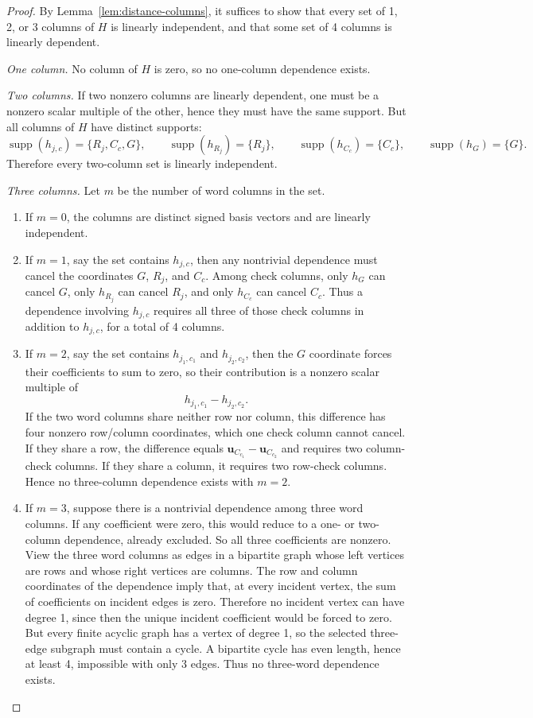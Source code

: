 \documentclass[11pt]{article}
\begin{document}
\begin{proof}
By Lemma~\ref{lem:distance-columns}, it suffices to show that every set of 1, 2, or 3 columns of $H$ is linearly independent, and that some set of 4 columns is linearly dependent.

\textit{One column.} No column of $H$ is zero, so no one-column dependence exists.

\textit{Two columns.} If two nonzero columns are linearly dependent, one must be a nonzero scalar multiple of the other, hence they must have the same support. But all columns of $H$ have distinct supports:
\[
    \operatorname{supp}(h_{j,c}) = \{R_j, C_c, G\},\qquad
    \operatorname{supp}(h_{R_j}) = \{R_j\},\qquad
    \operatorname{supp}(h_{C_c}) = \{C_c\},\qquad
    \operatorname{supp}(h_G) = \{G\}.
\]
Therefore every two-column set is linearly independent.

\textit{Three columns.} Let $m$ be the number of word columns in the set.
\begin{enumerate}[noitemsep]
    \item If $m = 0$, the columns are distinct signed basis vectors and are linearly independent.
    \item If $m = 1$, say the set contains $h_{j,c}$, then any nontrivial dependence must cancel the coordinates $G$, $R_j$, and $C_c$. Among check columns, only $h_G$ can cancel $G$, only $h_{R_j}$ can cancel $R_j$, and only $h_{C_c}$ can cancel $C_c$. Thus a dependence involving $h_{j,c}$ requires all three of those check columns in addition to $h_{j,c}$, for a total of 4 columns.
    \item If $m = 2$, say the set contains $h_{j_1,c_1}$ and $h_{j_2,c_2}$, then the $G$ coordinate forces their coefficients to sum to zero, so their contribution is a nonzero scalar multiple of
    \[
        h_{j_1,c_1} - h_{j_2,c_2}.
    \]
    If the two word columns share neither row nor column, this difference has four nonzero row/column coordinates, which one check column cannot cancel. If they share a row, the difference equals $\mathbf{u}_{C_{c_1}} - \mathbf{u}_{C_{c_2}}$ and requires two column-check columns. If they share a column, it requires two row-check columns. Hence no three-column dependence exists with $m = 2$.
    \item If $m = 3$, suppose there is a nontrivial dependence among three word columns. If any coefficient were zero, this would reduce to a one- or two-column dependence, already excluded. So all three coefficients are nonzero. View the three word columns as edges in a bipartite graph whose left vertices are rows and whose right vertices are columns. The row and column coordinates of the dependence imply that, at every incident vertex, the sum of coefficients on incident edges is zero. Therefore no incident vertex can have degree 1, since then the unique incident coefficient would be forced to zero. But every finite acyclic graph has a vertex of degree 1, so the selected three-edge subgraph must contain a cycle. A bipartite cycle has even length, hence at least 4, impossible with only 3 edges. Thus no three-word dependence exists.
\end{enumerate}


\end{proof}
\end{document}
